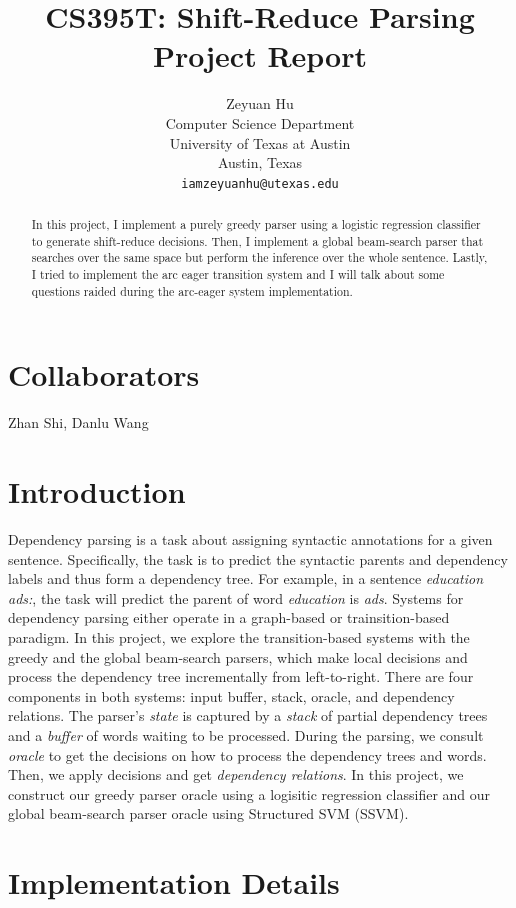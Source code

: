 \documentclass[11pt,a4paper]{article}
\title{CS395T: Shift-Reduce Parsing Project Report}
\author{Zeyuan Hu \\
  Computer Science Department \\
  University of Texas at Austin \\
  Austin, Texas \\
  {\tt iamzeyuanhu@utexas.edu} \\
}
\date{}
\begin{document}
\maketitle

\begin{abstract}
In this project, I implement a purely greedy parser using a logistic regression classifier
to generate shift-reduce decisions. Then, I implement a global beam-search parser that
searches over the same space but perform the inference over the whole sentence. Lastly, 
I tried to implement the arc eager transition system and I will talk about some 
questions raided during the arc-eager system implementation. 
\end{abstract}

\section{Collaborators}
Zhan Shi, Danlu Wang

\section{Introduction}

Dependency parsing is a task about assigning syntactic annotations for a given sentence.
Specifically, the task is to predict the syntactic parents and dependency labels and thus form
a dependency tree. For example, in a sentence \emph{education ads:}, the task will predict the 
parent of word \emph{education} is \emph{ads}. Systems for dependency parsing
either operate in a graph-based or trainsition-based paradigm. In this project,
we explore the transition-based systems with the greedy and the global beam-search
parsers, which make local decisions and process the dependency tree incrementally
from left-to-right. There are four components in both systems: input buffer, stack, oracle, and
dependency relations. The parser's \emph{state} is captured by a \emph{stack} of partial
dependency trees and a \emph{buffer} of words waiting to be processed. During the parsing,
we consult \emph{oracle} to get the decisions on how to process the dependency trees and words.
Then, we apply decisions and get \emph{dependency relations}. In this project, we construct 
our greedy parser oracle using a logisitic regression classifier and our global beam-search parser
oracle using Structured SVM (SSVM). 

\section{Implementation Details}
\end{document}
